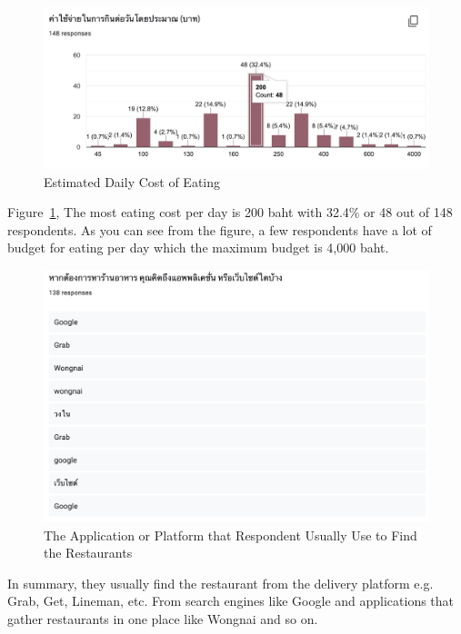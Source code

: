 \documentclass[12pt,oneside,openright,a4paper]{cpe-english-project}
\begin{document}
\begin{figure}[H]\centering
\includegraphics[width=350pt]{./images/A1EstimatedDailyCostofEating.png}
\caption{Estimated Daily Cost of Eating}\label{fig:A1EstimatedDailyCostofEating}
\end{figure}\vspace{-24pt}

Figure~\ref{fig:A1EstimatedDailyCostofEating}, The most eating cost per day is 200 baht with 32.4\% or 48 out of 148 respondents. As you can see from the figure, a few respondents have a lot of budget for eating per day which the maximum budget is 4,000 baht.

\begin{figure}[H]\centering
\includegraphics[width=350pt]{./images/A1TheApplicationorPlatformthatRespondentUsuallyUsetoFindtheRestaurants.png}
\caption{The Application or Platform that Respondent Usually Use to Find the Restaurants}\label{fig:A1TheApplicationorPlatformthatRespondentUsuallyUsetoFindtheRestaurants}
\end{figure}\vspace{-24pt}

In summary, they usually find the restaurant from the delivery platform e.g. Grab, Get, Lineman, etc. From search engines like Google and applications that gather restaurants in one place like Wongnai and so on.
\end{document}
